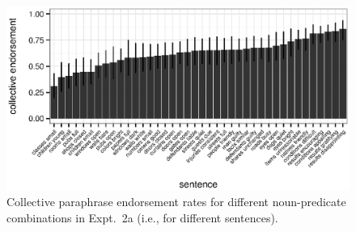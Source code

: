 \documentclass[linguex]{sp}
\begin{document}
\begin{figure}[h!]
	\centering
	\includegraphics[width=.985\linewidth]{plots/sentence_plot.eps}
	\caption{Collective paraphrase endorsement rates for different noun-predicate combinations in Expt.~2a (i.e., for different sentences).} \label{sentence-coll}
\end{figure}
\end{document}
